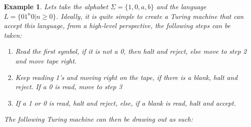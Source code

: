 \documentclass[12pt, letterpaper]{article}
\newtheorem{ex}[thm]{Example}
\begin{document}
\begin{ex}
Lets take the alphabet $\Sigma = \{ 1, 0, a, b \}$ and the language $L = \{ 01^n0 | n \geq 0 \}$. Ideally, it is quite simple to create a Turing machine that can accept this language, from a high-level perspective, the following steps can be taken:
\begin{enumerate}
\item Read the first symbol, if it is not a 0, then halt and reject, else move to step 2 and move tape right.
\item Keep reading 1's and moving right on the tape, if there is a blank, halt and reject. If a 0 is read, move to step 3
\item If a 1 or 0 is read, halt and reject, else, if a blank is read, halt and accept.
\end{enumerate}
The following Turing machine can then be drawing out as such:


\end{ex}
\end{document}
